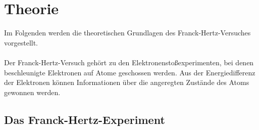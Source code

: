 \section{Theorie}

    Im Folgenden werden die theoretischen Grundlagen des Franck-Hertz-Versuches vorgestellt.\\
    \\
    Der Franck-Hertz-Versuch gehört zu den Elektronenstoßexperimenten,
    bei denen beschleunigte Elektronen auf Atome geschossen werden. %
    Aus der Energiedifferenz der Elektronen können Informationen über die angeregten Zustände des Atoms gewonnen werden.


\subsection{Das Franck-Hertz-Experiment}
\label{sec:grundprinzip}

